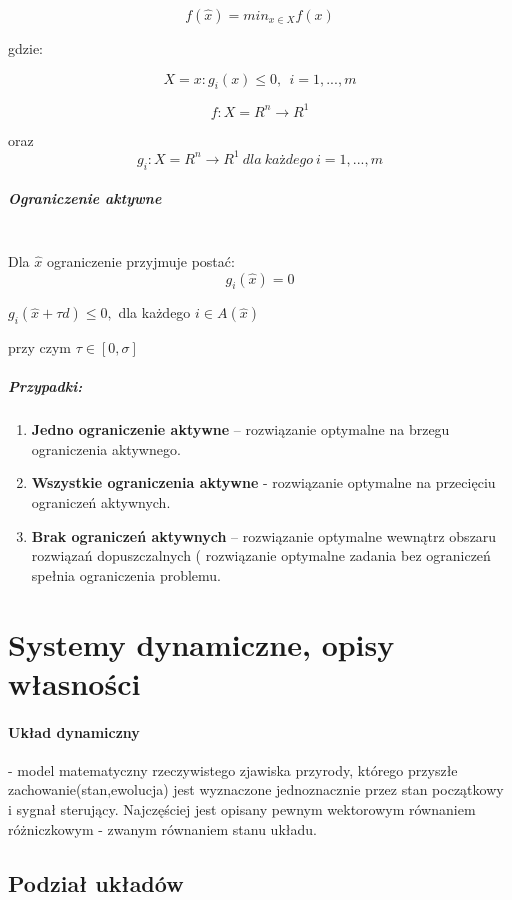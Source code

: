 \documentclass[a4paper,twoside]{report}
\begin{document}
$$f(\hat{x})=min_{x \in X}f(x)$$

gdzie:

$$X={x:g_i(x) \le 0,~~i=1,...,m}$$

$$f:X = R^n \longrightarrow R^1$$

oraz $$g_i:X = R^n \longrightarrow R^1~dla~każdego~i=1,...,m$$

\subparagraph{Ograniczenie aktywne\\\\}

Dla $\hat{x}$ ograniczenie przyjmuje postać:
\[  g_i(\hat{x})=0 \]

\begin{center}
$ g_i(\hat{x}+\tau d) \le 0,$ dla każdego $i \in A(\hat{x})$
\end{center}


przy czym $\tau \in [0,\sigma]$



\subparagraph{Przypadki:}

\begin{enumerate}

\item \textbf{Jedno ograniczenie aktywne} – rozwiązanie optymalne na brzegu ograniczenia
aktywnego.
\item \textbf{Wszystkie ograniczenia aktywne} - rozwiązanie optymalne na przecięciu ograniczeń
aktywnych.
\item \textbf{Brak ograniczeń aktywnych} – rozwiązanie optymalne wewnątrz obszaru rozwiązań
dopuszczalnych ( rozwiązanie optymalne zadania bez ograniczeń spełnia
ograniczenia problemu.
\end{enumerate}

\section{Systemy dynamiczne, opisy własności}

\paragraph{Układ dynamiczny} - model matematyczny rzeczywistego zjawiska przyrody, którego przyszłe zachowanie(stan,ewolucja) jest wyznaczone jednoznacznie przez stan początkowy i sygnał sterujący. Najczęściej jest opisany pewnym wektorowym równaniem różniczkowym - zwanym równaniem stanu układu. 
\subsection{Podział układów}
\end{document}
